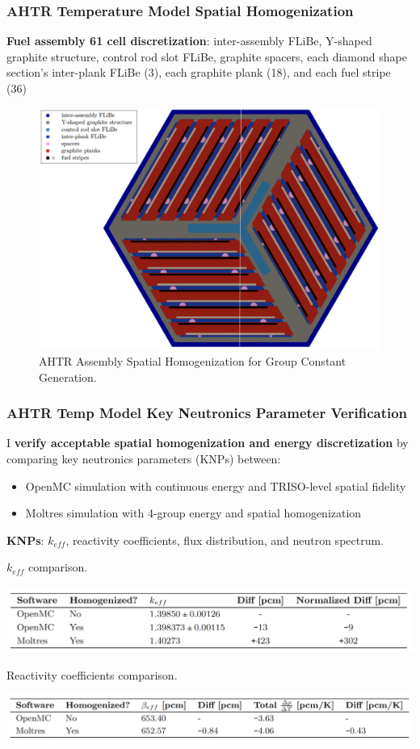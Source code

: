 \begin{frame}
    \frametitle{AHTR Temperature Model Spatial Homogenization}
        \textbf{Fuel assembly 61 cell discretization}: inter-assembly FLiBe, 
        Y-shaped graphite structure, control rod slot FLiBe, graphite spacers, 
        each diamond shape section's inter-plank FLiBe (3), each graphite plank (18), 
        and each fuel stripe (36)
    \begin{figure}[]
            \centering
            \includegraphics[width=0.65\linewidth]{figures/assembly_mg_pres.png}
        \caption{AHTR Assembly Spatial Homogenization for Group Constant Generation.}
    \end{figure}
\end{frame}

\begin{frame}
    \frametitle{AHTR Temp Model Key Neutronics Parameter Verification}
    I \textbf{verify acceptable spatial homogenization and energy discretization} by 
    comparing key neutronics parameters (KNPs) between: 
    \begin{itemize} 
        \item OpenMC simulation with continuous energy and TRISO-level spatial fidelity
        \item Moltres simulation with 4-group energy and spatial homogenization
    \end{itemize}
    \textbf{KNPs}: $k_{eff}$, reactivity coefficients, flux distribution, and neutron spectrum. 
        \begin{table}
            \caption{ $k_{eff}$ comparison.}
            \includegraphics[width=0.85\linewidth]{figures/benchmark-keff.png}
        \end{table}
        \begin{table}
            \caption{Reactivity coefficients comparison.}
            \includegraphics[width=0.85\linewidth]{figures/benchmark-coeff.png}
        \end{table}
\end{frame}


